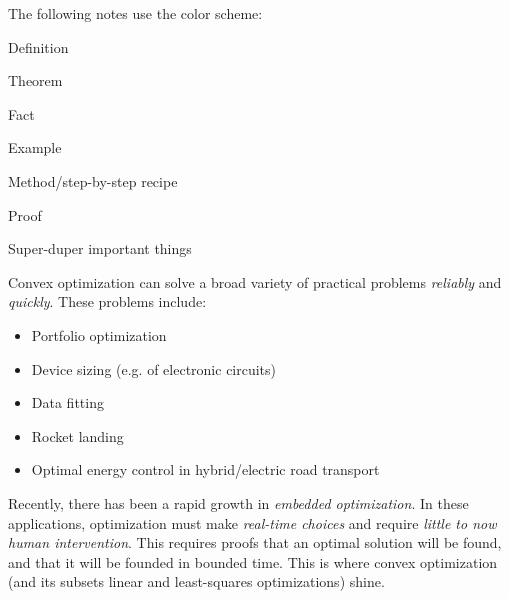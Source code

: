 
The following notes use the color scheme:

\begin{Definition}
Definition
\end{Definition}
\begin{Theorem}
Theorem
\end{Theorem}
\begin{Fact}
Fact
\end{Fact}
\begin{Example}
Example
\end{Example}
\begin{Method}
Method/step-by-step recipe
\end{Method}
\begin{Proof}
Proof
\end{Proof}
\begin{VeryImportantStuff}
Super-duper important things
\end{VeryImportantStuff}


Convex optimization can solve a broad variety of practical problems \textit{reliably} and \textit{quickly}. These problems include:

\begin{itemize}
\item Portfolio optimization
\item Device sizing (e.g. of electronic circuits)
\item Data fitting
\item Rocket landing
\item Optimal energy control in hybrid/electric road transport
\end{itemize}

Recently, there has been a rapid growth in \textit{embedded optimization}. In these applications, optimization must make \textit{real-time choices} and require \textit{little to now human intervention}. This requires proofs that an optimal solution will be found, and that it will be founded in bounded time. This is where convex optimization (and its subsets linear and least-squares optimizations) shine.
